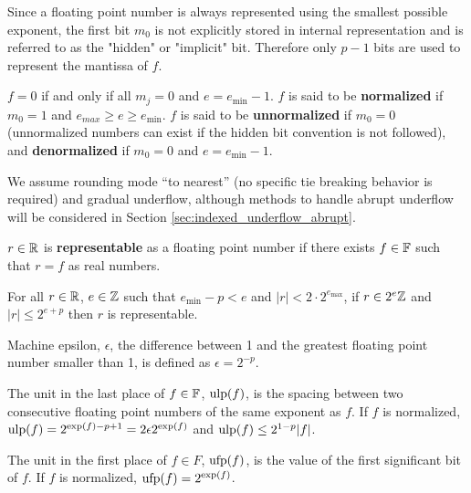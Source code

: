   Since a floating point number is always represented using the smallest possible
  exponent, the first bit $m_0$ is not explicitly stored in internal representation
  and is referred to as the "hidden" or "implicit" bit.
  Therefore only $p-1$ bits are used to represent the mantissa of $f$.

  $f = 0$ if and only if all $m_j = 0$ and $e = e_{\min} - 1$.
  $f$ is said to be \textbf{normalized} if $m_0 =1$
  and $e_{max} \geq e \geq e_{\min}$.
  $f$ is said to be \textbf{unnormalized} if $m_0 = 0$ (unnormalized numbers can 
  exist if the hidden bit convention is not followed), and
  \textbf{denormalized} if $m_0 = 0$ and $e = e_{\min} - 1$.

  \begin{comment}
  In binary internal representation, $f=0$ is represented by a biased exponent of $0$
  as well as a mantissa field of all 0-bits.
  Denormalized numbers have biased exponent of $0$ and non-zero mantissa field.
  An exponent field of all 1-bits and a mantissa field of all 0-bits
  represent infinities, positive or negative depending on the sign bit.
  An exponent field of all 1-bits and a non-zero mantissa field
  represent a NaN value.
  \end{comment}

  We assume rounding mode ``to nearest'' (no specific tie
  breaking behavior is required) and gradual underflow, although
  methods to handle abrupt underflow will be considered in Section
  \ref{sec:indexed_underflow_abrupt}.

  $r \in \mathbb{R}$ is \textbf{representable} as a floating point number if there
  exists $f \in \mathbb{F}$ such that $r = f$ as real numbers.

  For all $r \in \mathbb{R}$, $e \in \mathbb{Z}$ such that $e_{\min} - p < e$ and $|r| < 2
  \cdot 2^{e_{\max}}$, if $r \in 2^e\mathbb{Z}$ and $|r| \leq 2^{e + p}$ then $r$ is
  representable.

  Machine epsilon, $\epsilon$, the difference between 1 and the greatest
  floating point number smaller than 1, is defined as $\epsilon = 2^{-p}$.

  The unit in the last place of $f \in \mathbb{F}$, $\text{ulp}(f)$, is the spacing between
  two consecutive floating point numbers of the same exponent as $f$. If $f$ is
  normalized, $\text{ulp}(f) = 2^{\text{exp}(f) - p + 1} = 2  \epsilon  2^{\text{exp}(f)}$ and
  $\text{ulp}(f) \leq 2^{1 - p}|f|$.

  The unit in the first place of $f \in F$, $\text{ufp}(f)$, is the value of the
  first significant bit of $f$. If $f$ is normalized, $\text{ufp}(f) = 2^{\text{exp}(f)}$.

